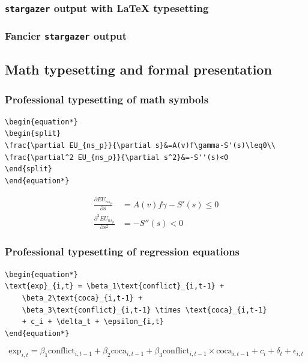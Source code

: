 \documentclass{beamer} %
\begin{document}
\begin{frame}
\frametitle{\texttt{stargazer} output with {\LaTeX} typesetting}
\resizebox{\linewidth}{!}{

}
\end{frame}

\begin{frame}
\frametitle{Fancier \texttt{stargazer} output}
\resizebox{\linewidth}{!}{

}
\end{frame}
 
\subsection{Math typesetting and formal presentation}
\begin{frame}[fragile=singleslide]
\frametitle{Professional typesetting of math symbols}
\begin{scriptsize}
\begin{verbatim}
\begin{equation*}
\begin{split}
\frac{\partial EU_{ns_p}}{\partial s}&=A(v)f\gamma-S'(s)\leq0\\
\frac{\partial^2 EU_{ns_p}}{\partial s^2}&=-S''(s)<0
\end{split}
\end{equation*}\end{verbatim}
\end{scriptsize}
\begin{equation*}
\begin{split}
\frac{\partial EU_{ns_p}}{\partial s}&=A(v)f\gamma-S'(s)\leq0\\
\frac{\partial^2 EU_{ns_p}}{\partial s^2}&=-S''(s)<0
\end{split}
\end{equation*}
\end{frame}
 
\begin{frame}[fragile=singleslide]
\frametitle{Professional typesetting of regression equations}
\begin{scriptsize}
\begin{verbatim}
\begin{equation*}
\text{exp}_{i,t} = \beta_1\text{conflict}_{i,t-1} + 
	\beta_2\text{coca}_{i,t-1} + 
	\beta_3\text{conflict}_{i,t-1} \times \text{coca}_{i,t-1} 
	+ c_i + \delta_t + \epsilon_{i,t}
\end{equation*}
\end{verbatim}
\begin{equation*}
\text{exp}_{i,t} = \beta_1\text{conflict}_{i,t-1} + 
\beta_2\text{coca}_{i,t-1} + 
\beta_3\text{conflict}_{i,t-1}\times\text{coca}_{i,t-1} +c_i+\delta_t+\epsilon_{i,t}
\end{equation*}
\end{scriptsize}
\end{frame}
 
\end{document}
